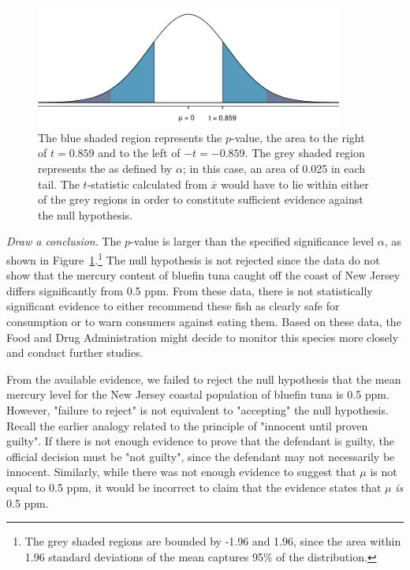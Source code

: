 \begin{spacing}{1.5}
\begin{example}
\begin{figure}[h]
	\centering
	\includegraphics[width=0.9\textwidth]{ch_inference_foundations_oi_biostat/figures/pValueTuna/pValueTuna}
	\caption{The blue shaded region represents the $p$-value, the area to the right of $t = 0.859$ and to the left of $-t = -0.859$. The grey shaded region represents the  as defined by $\alpha$; in this case, an area of 0.025 in each tail. The $t$-statistic calculated from $\overline{x}$ would have to lie within either of the grey regions in order to constitute sufficient evidence against the null hypothesis.}
	\label{pValueTuna}
\end{figure}

\textit{Draw a conclusion}. The $p$-value is larger than the specified significance level $\alpha$, as shown in Figure~\ref{pValueTuna}.\footnote{The grey shaded regions are bounded by -1.96 and 1.96, since the area within 1.96 standard deviations of the mean captures 95\% of the distribution.} The null hypothesis is not rejected since the data do not show that the mercury content of bluefin tuna caught off the coast of New Jersey differs significantly from 0.5 ppm. From these data, there is not statistically significant evidence to either recommend these fish as clearly safe for consumption or to warn consumers against eating them. Based on these data, the Food and Drug Administration might decide to monitor this species more closely and conduct further studies. 

From the available evidence, we failed to reject the null hypothesis that the mean mercury level for the New Jersey coastal population of bluefin tuna is 0.5 ppm. However, "failure to reject" is not equivalent to "accepting" the null hypothesis. Recall the earlier analogy related to the principle of "innocent until proven guilty". If there is not enough evidence to prove that the defendant is guilty, the official decision must be "not guilty", since the defendant may not necessarily be innocent. Similarly, while there was not enough evidence to suggest that $\mu$ is not equal to 0.5 ppm, it would be incorrect to claim that the evidence states that $\mu$ \textit{is} 0.5 ppm.


\end{example}
\end{spacing}
